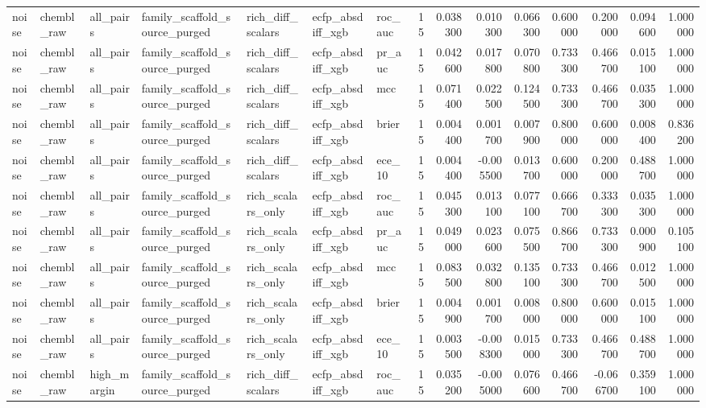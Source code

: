 \begin{longtable}{lllllllrrrrrrrr}
noise & chembl\_raw & all\_pairs & family\_scaffold\_source\_purged & rich\_diff\_scalars & ecfp\_absdiff\_xgb & roc\_auc & 15 & 0.038300 & 0.010300 & 0.066300 & 0.600000 & 0.200000 & 0.094600 & 1.000000 \\
noise & chembl\_raw & all\_pairs & family\_scaffold\_source\_purged & rich\_diff\_scalars & ecfp\_absdiff\_xgb & pr\_auc & 15 & 0.042600 & 0.017800 & 0.070800 & 0.733300 & 0.466700 & 0.015100 & 1.000000 \\
noise & chembl\_raw & all\_pairs & family\_scaffold\_source\_purged & rich\_diff\_scalars & ecfp\_absdiff\_xgb & mcc & 15 & 0.071400 & 0.022500 & 0.124500 & 0.733300 & 0.466700 & 0.035300 & 1.000000 \\
noise & chembl\_raw & all\_pairs & family\_scaffold\_source\_purged & rich\_diff\_scalars & ecfp\_absdiff\_xgb & brier & 15 & 0.004400 & 0.001700 & 0.007900 & 0.800000 & 0.600000 & 0.008400 & 0.836200 \\
noise & chembl\_raw & all\_pairs & family\_scaffold\_source\_purged & rich\_diff\_scalars & ecfp\_absdiff\_xgb & ece\_10 & 15 & 0.004400 & -0.005500 & 0.013700 & 0.600000 & 0.200000 & 0.488700 & 1.000000 \\
noise & chembl\_raw & all\_pairs & family\_scaffold\_source\_purged & rich\_scalars\_only & ecfp\_absdiff\_xgb & roc\_auc & 15 & 0.045300 & 0.013100 & 0.077100 & 0.666700 & 0.333300 & 0.035300 & 1.000000 \\
noise & chembl\_raw & all\_pairs & family\_scaffold\_source\_purged & rich\_scalars\_only & ecfp\_absdiff\_xgb & pr\_auc & 15 & 0.049000 & 0.023600 & 0.075500 & 0.866700 & 0.733300 & 0.000900 & 0.105100 \\
noise & chembl\_raw & all\_pairs & family\_scaffold\_source\_purged & rich\_scalars\_only & ecfp\_absdiff\_xgb & mcc & 15 & 0.083500 & 0.032800 & 0.135100 & 0.733300 & 0.466700 & 0.012500 & 1.000000 \\
noise & chembl\_raw & all\_pairs & family\_scaffold\_source\_purged & rich\_scalars\_only & ecfp\_absdiff\_xgb & brier & 15 & 0.004900 & 0.001700 & 0.008000 & 0.800000 & 0.600000 & 0.015100 & 1.000000 \\
noise & chembl\_raw & all\_pairs & family\_scaffold\_source\_purged & rich\_scalars\_only & ecfp\_absdiff\_xgb & ece\_10 & 15 & 0.003500 & -0.008300 & 0.015000 & 0.733300 & 0.466700 & 0.488700 & 1.000000 \\
noise & chembl\_raw & high\_margin & family\_scaffold\_source\_purged & rich\_diff\_scalars & ecfp\_absdiff\_xgb & roc\_auc & 15 & 0.035200 & -0.005000 & 0.076600 & 0.466700 & -0.066700 & 0.359100 & 1.000000 \\

\end{longtable}
